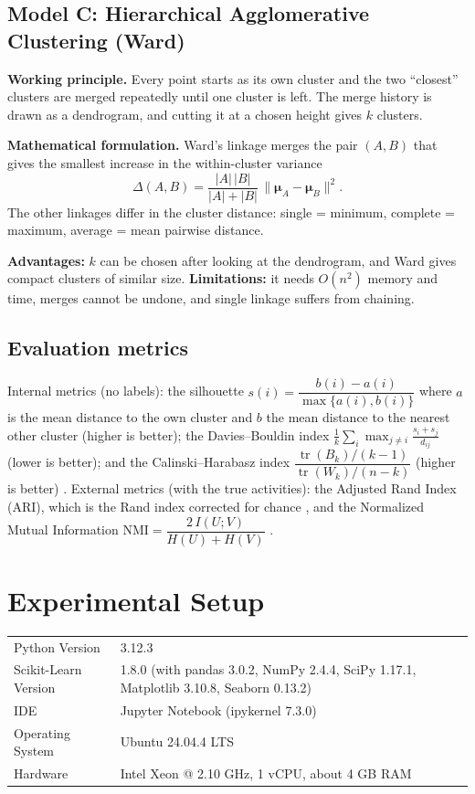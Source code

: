 \documentclass[12pt,a4paper]{article}
\begin{document}
\subsection*{Model C: Hierarchical Agglomerative Clustering (Ward)}
\textbf{Working principle.} Every point starts as its own cluster and the two ``closest'' clusters are merged repeatedly until one cluster is left. The merge history is drawn as a dendrogram, and cutting it at a chosen height gives $k$ clusters.

\textbf{Mathematical formulation.} Ward's linkage \cite{ward1963} merges the pair $(A,B)$ that gives the smallest increase in the within-cluster variance
\begin{equation}
\Delta(A,B)=\frac{|A|\,|B|}{|A|+|B|}\,\lVert \boldsymbol{\mu}_A-\boldsymbol{\mu}_B\rVert^{2}.
\end{equation}
The other linkages differ in the cluster distance: single = minimum, complete = maximum, average = mean pairwise distance.

\textbf{Advantages:} $k$ can be chosen after looking at the dendrogram, and Ward gives compact clusters of similar size. \textbf{Limitations:} it needs $O(n^2)$ memory and time, merges cannot be undone, and single linkage suffers from chaining.

\subsection*{Evaluation metrics}
Internal metrics (no labels): the silhouette $s(i)=\dfrac{b(i)-a(i)}{\max\{a(i),b(i)\}}$ where $a$ is the mean distance to the own cluster and $b$ the mean distance to the nearest other cluster (higher is better); the Davies--Bouldin index $\frac{1}{k}\sum_i\max_{j\ne i}\frac{s_i+s_j}{d_{ij}}$ (lower is better); and the Calinski--Harabasz index $\dfrac{\operatorname{tr}(B_k)/(k-1)}{\operatorname{tr}(W_k)/(n-k)}$ (higher is better) \cite{rousseeuw1987,davies1979,calinski1974}. External metrics (with the true activities): the Adjusted Rand Index (ARI), which is the Rand index corrected for chance \cite{hubert1985}, and the Normalized Mutual Information $\mathrm{NMI}=\dfrac{2\,I(U;V)}{H(U)+H(V)}$ \cite{strehl2002}.

\section{Experimental Setup}
\begin{tabular}{lp{11cm}}
\toprule
Python Version & 3.12.3 \\
Scikit-Learn Version & 1.8.0 \cite{pedregosa2011} (with pandas 3.0.2, NumPy 2.4.4, SciPy 1.17.1, Matplotlib 3.10.8, Seaborn 0.13.2) \\
IDE & Jupyter Notebook (ipykernel 7.3.0) \\
Operating System & Ubuntu 24.04.4 LTS \\
Hardware & Intel Xeon @ 2.10 GHz, 1 vCPU, about 4 GB RAM \\
\bottomrule
\end{tabular}
\end{document}
